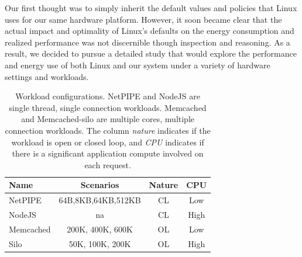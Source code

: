 Our first thought was to simply inherit the default values and policies that Linux uses for our same hardware platform.
However, it soon became clear that the actual impact and optimality of Linux's defaults on the energy consumption and realized performance was not discernible though inspection and reasoning.  
As a result, we decided to pursue a detailed study that would explore the performance and energy use of both Linux and our system under a variety of hardware settings and workloads. 





\begin{table}[t]
\centering
\begin{tabular}{l|c|c|c}
  Name & Scenarios & Nature & CPU\\
  \hline
  NetPIPE & {\small 64B,8KB,64KB,512KB} & CL & Low\\ \hline
  NodeJS & na & CL & High \\ \hline
  Memcached & 200K, 400K, 600K & OL & Low \\ \hline
  Silo & 50K, 100K, 200K & OL & High \\ 
\end{tabular}
\caption{Workload configurations. NetPIPE and NodeJS are single thread, single connection workloads. Memcached and Memcached-silo are multiple cores, multiple connection workloads. The column {\em nature} indicates if the workload is open or closed loop, and {\em CPU} indicates if there is a significant application compute involved on each request.}
\label{table:wrkcfgs}	
\end{table}



